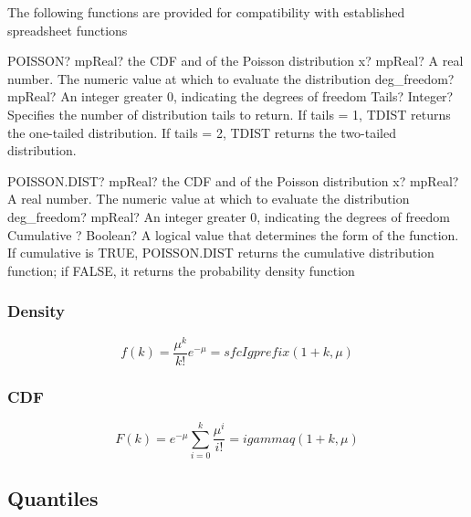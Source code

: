 \vspace{0.3cm}
The following functions are provided for compatibility with established spreadsheet functions

\vspace{0.3cm}
\begin{mpFunctionsExtract}
	\mpWorksheetFunctionThreeNotImplemented
	{POISSON? mpReal? the CDF and of the Poisson distribution}
	{x? mpReal? A real number. The numeric value at which to evaluate the distribution}
	{deg\_freedom? mpReal? An integer  greater 0, indicating the degrees of freedom}
	{Tails? Integer? Specifies the number of distribution tails to return. If tails = 1, TDIST returns the one-tailed distribution. If tails = 2, TDIST returns the two-tailed distribution.}
\end{mpFunctionsExtract}

\vspace{0.6cm}
\begin{mpFunctionsExtract}
	\mpWorksheetFunctionThreeNotImplemented
	{POISSON.DIST? mpReal? the CDF and of the Poisson distribution}
	{x? mpReal? A real number. The numeric value at which to evaluate the distribution}
	{deg\_freedom? mpReal? An integer  greater 0, indicating the degrees of freedom}
	{Cumulative ? Boolean? A logical value that determines the form of the function. If cumulative is TRUE, POISSON.DIST returns the cumulative distribution function; if FALSE, it returns the probability density function}
\end{mpFunctionsExtract}



\subsubsection{Density}
\label{PoissonDistributionDensity}

\begin{equation} 
	f(k)= \frac{\mu^k}{k!} e^{-\mu} = sfcIgprefix(1+k,\mu)
\end{equation}


\subsubsection{CDF}
\begin{equation} 
	F(k)=  e^{-\mu} \sum_{i=0}^k \frac{\mu^i}{i!} = igammaq(1+k,\mu)
\end{equation}




\subsection{Quantiles}

